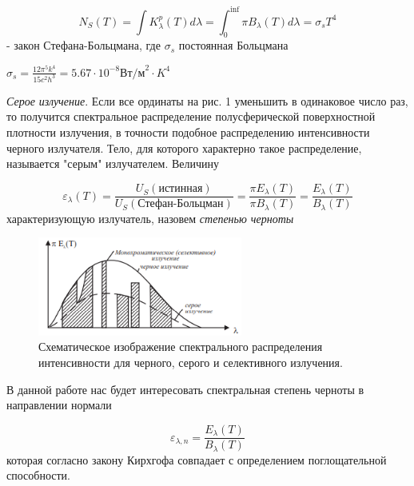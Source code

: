 \documentclass[12pt,a4paper]{article}
\begin{document}
\begin{equation}
N_S(T) = \int K_{\lambda}^p(T)d{\lambda} = \int_0^{\inf}{\pi}B_{\lambda}(T)d{\lambda} = \sigma_s{T^4}
\end{equation}
- закон Стефана-Больцмана, где $\sigma_s$ постоянная Больцмана
\begin{center}
$\sigma_s = \frac{12{\pi}^5k^4}{15c^2h^3} = 5.67\cdot10^{-8}\textbf{Вт/м}^2\cdot{K^4}$
\end{center}

\par \textit{Серое излучение}. Если все ординаты на рис. 1 уменьшить в одинаковое число раз, то получится спектральное распределение полусферической поверхностной плотности излучения, в точности подобное распределению интенсивности черного излучателя. Тело, для которого характерно такое распределение, называется "серым" излучателем. Величину 

\begin{equation}
\varepsilon_{\lambda}(T) = \frac{U_S(\text{истинная})}{U_S(\text{Стефан-Больцман})} = \frac{{\pi}E_{\lambda}(T)}{{\pi}B_{\lambda}(T)} = \frac{E_{\lambda}(T)}{B_{\lambda}(T)}
\end{equation}
характеризующую излучатель, назовем \textit{степенью черноты}

\begin{figure}[h!]
	\begin{center}
		\includegraphics[width = 0.6\textwidth]{MSS-1-2}
		\caption{ Схематическое изображение
спектрального распределения интенсивности для черного, серого и селективного излучения.}
	\end{center}
\end{figure}

\par В данной работе нас будет интересовать спектральная степень черноты в направлении нормали

\begin{equation}
\varepsilon_{\lambda ,n} = \frac{E_{\lambda}(T)}{B_{\lambda}(T)}
\end{equation}
которая согласно закону Кирхгофа совпадает с определением поглощательной способности.
\end{document}
